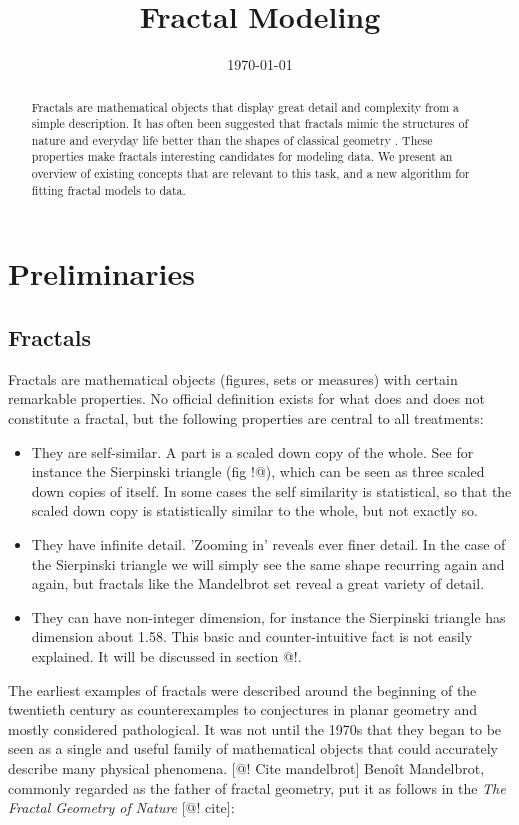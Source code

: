 \documentclass{article}
\title{Fractal Modeling}
\date{\today}
\theoremstyle{definition}
\begin{document}
\maketitle

\begin{abstract}
Fractals are mathematical objects that display great detail and complexity from a simple description. It has often been suggested that fractals mimic the structures of nature and everyday life better than the shapes of classical geometry \cite{}. These properties make fractals interesting candidates for modeling data. We present an overview of existing concepts that are relevant to this task, and a new algorithm for fitting fractal models to data. 
\end{abstract}


\section{Preliminaries}
\subsection{Fractals}

Fractals are mathematical objects (figures, sets or measures) with certain remarkable properties. No official definition exists for what does and does not constitute a fractal, but the following properties are central to all treatments:
\begin{itemize}
  \item They are self-similar. A part is a scaled down copy of the whole. See for instance the Sierpinski triangle (fig !@), which can be seen as three scaled down copies of itself. In some cases the self similarity is statistical, so that the scaled down copy is statistically similar to the whole, but not exactly so.
  \item They have infinite detail. 'Zooming in' reveals ever finer detail. In the case of the Sierpinski triangle we will simply see the same shape recurring again and again, but fractals like the Mandelbrot set reveal a great variety of detail.
  \item They can have non-integer dimension, for instance the Sierpinski triangle has dimension about 1.58. This basic and counter-intuitive fact is not easily explained. It will be discussed in section @!.
\end{itemize}

The earliest examples of fractals were described around the beginning of the twentieth century as counterexamples to conjectures in planar geometry and mostly considered pathological. It was not until the 1970s that they began to be seen as a single and useful family of mathematical objects that could accurately describe many physical phenomena. [@! Cite mandelbrot] Beno\^it Mandelbrot, commonly regarded as the father of fractal geometry, put it as follows in the \emph{The Fractal Geometry of Nature} [@! cite]:
\end{document}
